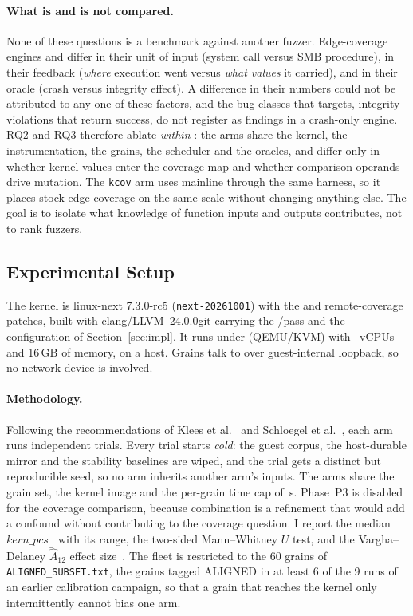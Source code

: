 \documentclass{article}
\begin{document}
\paragraph{What is and is not compared.} None of these questions is a
benchmark against another fuzzer. Edge-coverage engines and \toolname differ
in their unit of input (system call versus SMB procedure), in their feedback
(\emph{where} execution went versus \emph{what values} it carried), and in
their oracle (crash versus integrity effect). A difference in their numbers
could not be attributed to any one of these factors, and the bug classes that
\toolname targets, integrity violations that return success, do not register
as findings in a crash-only engine. RQ2 and RQ3 therefore ablate
\emph{within} \toolname: the arms share the kernel, the instrumentation, the
grains, the scheduler and the oracles, and differ only in whether kernel
values enter the coverage map and whether comparison operands drive mutation.
The \texttt{kcov} arm uses mainline \tracepc through the same harness, so it
places stock edge coverage on the same scale without changing anything else.
The goal is to isolate what knowledge of function inputs and outputs
contributes, not to rank fuzzers.

\subsection{Experimental Setup}

The kernel is linux-next 7.3.0-rc5 (\texttt{next-20261001}) with the \kcovdf
and \ksmbd remote-coverage patches, built with clang/LLVM~24.0.0git
carrying the \traceargs/\traceret pass and the configuration of
Section~\ref{sec:impl}. It runs under \virtme (QEMU/KVM) with
~vCPUs and 16\,GB of memory, on a  host.
Grains talk to \ksmbd over guest-internal loopback, so no network device is
involved.

\paragraph{Methodology.} Following the recommendations of Klees et
al.~\cite{klees2018evaluating} and Schloegel et al.~\cite{schloegel2024sok},
each arm runs  independent trials. Every trial starts
\emph{cold}: the guest corpus, the host-durable mirror and the stability
baselines are wiped, and the trial gets a distinct but reproducible seed, so
no arm inherits another arm's inputs. The arms share the grain set, the
kernel image and the per-grain time cap of \,s. Phase~P3 is
disabled for the coverage comparison, because combination is a refinement
that would add a confound without contributing to the coverage question. I
report the median $\mathit{kern\_pcs}_\cup$ with its range, the two-sided
Mann--Whitney $U$ test, and the Vargha--Delaney
$\hat{A}_{12}$ effect size~\cite{arcuri2011practical}. The fleet is restricted to the 60
grains of \texttt{ALIGNED\_SUBSET.txt}, the grains tagged ALIGNED in at least
6 of the 9 runs of an earlier calibration campaign, so that a grain that
reaches the kernel only intermittently cannot bias one arm.
\end{document}
